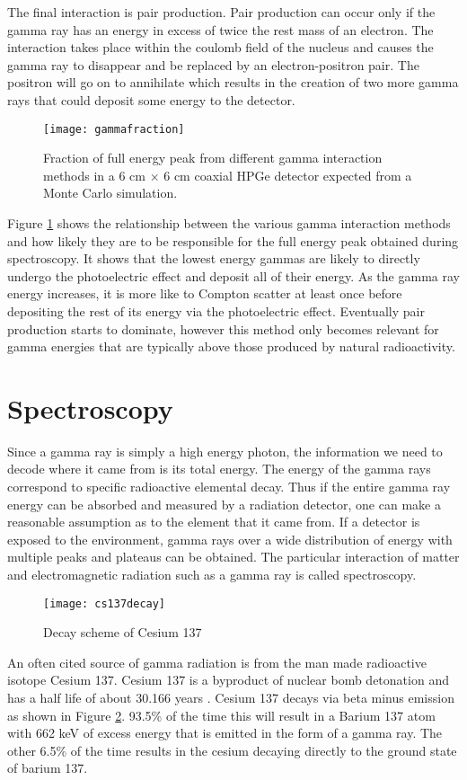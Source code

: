 The final interaction is pair production.
Pair production can occur only if the gamma ray has an energy in excess of twice the rest mass of an electron.
The interaction takes place within the coulomb field of the nucleus and causes the gamma ray to disappear and be replaced by an electron-positron pair.
The positron will go on to annihilate which results in the creation of two more gamma rays that could deposit some energy to the detector.
\begin{figure}[htpb]
\centering
\texttt{[image: gammafraction]}
  \caption{Fraction of full energy peak from different gamma interaction methods in a 6 cm $\times$ 6 cm coaxial HPGe detector expected from a Monte Carlo simulation. \cite{Roth1984SegmentationAP}}
\label{fig:gammafraction}
\end{figure}
Figure \ref{fig:gammafraction} shows the relationship between the various gamma interaction methods and how likely they are to be responsible for the full energy peak obtained during spectroscopy.
It shows that the lowest energy gammas are likely to directly undergo the photoelectric effect and deposit all of their energy.
As the gamma ray energy increases, it is more like to Compton scatter at least once before depositing the rest of its energy via the photoelectric effect.
Eventually pair production starts to dominate, however this method only becomes relevant for gamma energies that are typically above those produced by natural radioactivity.

\section{Spectroscopy}
Since a gamma ray is simply a high energy photon, the information we need to decode where it came from is its total energy.
The energy of the gamma rays correspond to specific radioactive elemental decay.
Thus if the entire gamma ray energy can be absorbed and measured by a radiation detector, one can make a reasonable assumption as to the element that it came from.
If a detector is exposed to the environment, gamma rays over a wide distribution of energy with multiple peaks and plateaus can be obtained.
The particular interaction of matter and electromagnetic radiation such as a gamma ray is called spectroscopy.

\begin{figure}[htpb]
\centering
\texttt{[image: cs137decay]}
\caption{Decay scheme of Cesium 137}
\label{fig:cs137decay}
\end{figure}
An often cited source of gamma radiation is from the man made radioactive isotope Cesium 137.
Cesium 137 is a byproduct of nuclear bomb detonation and has a half life of about 30.166 years \cite{1992NIMPA}.
Cesium 137 decays via beta minus emission as shown in Figure \ref{fig:cs137decay}.
93.5\% of the time this will result in a Barium 137 atom with 662 keV of excess energy that is emitted in the form of a gamma ray.
The other 6.5\% of the time results in the cesium decaying directly to the ground state of barium 137.

